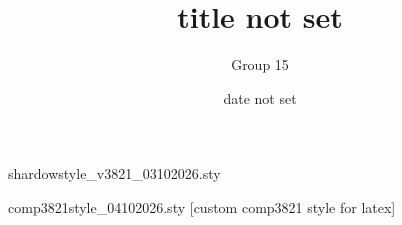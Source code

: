 \begin{filecontents*}{shardowstyle_v3821_03102026.sty}

\newcommand{\indicator}[2][\phantom{}]{\mathbb{I}_{#1}(#2)}
\newcommand{\transpose}{\top}

\newcommand{\questioncontent}[1]{\textbf{#1}}
\newcommand{\code}[1]{\texttt{#1}}


\title{title not set}
\author{Group 15}
\date{date not set}
\end{filecontents*}

\begin{filecontents*}{comp3821style_04102026.sty}
[custom comp3821 style for latex]


\usepackage{amsmath}
\usepackage{amsfonts}
\usepackage{mathtools}

\usepackage{amssymb}
\usepackage{amsthm}

\usepackage[framemethod=tikz]{mdframed}
\usepackage{wrapfig}

\usepackage{geometry}
\usepackage{parskip}


\usepackage{XCharter}

\usepackage{booktabs}
\usepackage{hyperref}

\usepackage[
    spacing=on,
    protrusion=false,
    expansion=alltext
]{microtype}

\renewcommand{\familydefault}{pplj}

\setlength{\parskip}{1.2ex plus 0.2ex minus 0.2ex}


\usepackage{centernot}
\usepackage{fancyhdr}
\usepackage{multicol}
\usepackage{array}



\pagestyle{fancy}
\fancyhf{}


\theoremstyle{definition}
\newtheorem{theorem}{Theorem}
\newtheorem{lemma}{Lemma}
\newtheorem{corollary}{Corollary}
\newtheorem{proposition}{Proposition}
\theoremstyle{definition}
\newtheorem{definition}{Definition}





\end{filecontents*}
